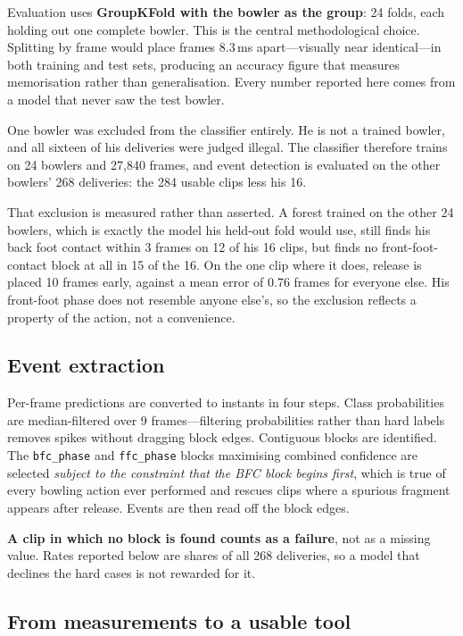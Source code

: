 \documentclass[11pt,a4paper]{article}
\begin{document}
Evaluation uses \textbf{GroupKFold with the bowler as the group}: 24 folds,
each holding out one complete bowler. This is the central methodological
choice. Splitting by frame would place frames 8.3\,ms apart---visually near
identical---in both training and test sets, producing an accuracy figure that
measures memorisation rather than generalisation. Every number reported here
comes from a model that never saw the test bowler.

One bowler was excluded from the classifier entirely. He is not a trained
bowler, and all sixteen of his deliveries were judged illegal. The classifier
therefore trains on 24 bowlers and 27{,}840 frames, and event detection is
evaluated on the other bowlers' 268 deliveries: the 284 usable clips less his 16.

That exclusion is measured rather than asserted. A forest trained on the other
24 bowlers, which is exactly the model his held-out fold would use, still finds
his back foot contact within 3 frames on 12 of his 16 clips, but finds no
front-foot-contact block at all in 15 of the 16. On the one clip where it does,
release is placed 10 frames early, against a mean error of 0.76 frames for
everyone else. His front-foot phase does not resemble anyone else's, so the
exclusion reflects a property of the action, not a convenience.

\subsection{Event extraction}

Per-frame predictions are converted to instants in four steps. Class
probabilities are median-filtered over 9 frames---filtering probabilities
rather than hard labels removes spikes without dragging block edges. Contiguous
blocks are identified. The \texttt{bfc\_phase} and \texttt{ffc\_phase} blocks
maximising combined confidence are selected \emph{subject to the constraint
that the BFC block begins first}, which is true of every bowling action ever
performed and rescues clips where a spurious fragment appears after release.
Events are then read off the block edges.

\textbf{A clip in which no block is found counts as a failure}, not as a
missing value. Rates reported below are shares of all 268 deliveries, so a
model that declines the hard cases is not rewarded for it.

\subsection{From measurements to a usable tool}
\label{sec:tool}
\end{document}
